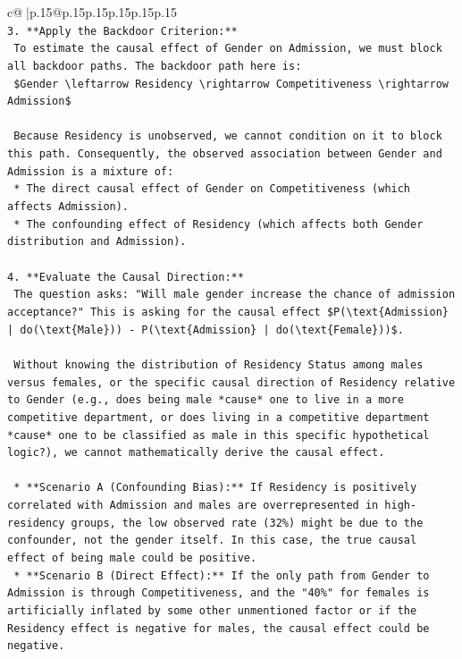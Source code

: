 \documentclass{article}
\begin{document}
{\begin{supertabular}{c@{$\;$}|p{.15\linewidth}@{}p{.15\linewidth}p{.15\linewidth}p{.15\linewidth}p{.15\linewidth}p{.15\linewidth}}
{{{\\ 
\texttt{3.  **Apply the Backdoor Criterion:**} \\
\texttt{    To estimate the causal effect of Gender on Admission, we must block all backdoor paths. The backdoor path here is:} \\
\texttt{    \$Gender \textbackslash{}leftarrow Residency \textbackslash{}rightarrow Competitiveness \textbackslash{}rightarrow Admission\$} \\
\\ 
\texttt{    Because Residency is unobserved, we cannot condition on it to block this path. Consequently, the observed association between Gender and Admission is a mixture of:} \\
\texttt{    *   The direct causal effect of Gender on Competitiveness (which affects Admission).} \\
\texttt{    *   The confounding effect of Residency (which affects both Gender distribution and Admission).} \\
\\ 
\texttt{4.  **Evaluate the Causal Direction:**} \\
\texttt{    The question asks: "Will male gender increase the chance of admission acceptance?" This is asking for the causal effect \$P(\textbackslash{}text\{Admission\} | do(\textbackslash{}text\{Male\})) {-} P(\textbackslash{}text\{Admission\} | do(\textbackslash{}text\{Female\}))\$.} \\
\\ 
\texttt{    Without knowing the distribution of Residency Status among males versus females, or the specific causal direction of Residency relative to Gender (e.g., does being male *cause* one to live in a more competitive department, or does living in a competitive department *cause* one to be classified as male in this specific hypothetical logic?), we cannot mathematically derive the causal effect.} \\
\\ 
\texttt{    *   **Scenario A (Confounding Bias):** If Residency is positively correlated with Admission and males are overrepresented in high{-}residency groups, the low observed rate (32\%) might be due to the confounder, not the gender itself. In this case, the true causal effect of being male could be positive.} \\
\texttt{    *   **Scenario B (Direct Effect):** If the only path from Gender to Admission is through Competitiveness, and the "40\%" for females is artificially inflated by some other unmentioned factor or if the Residency effect is negative for males, the causal effect could be negative.} \\
}}}
\end{supertabular}}
\end{document}
